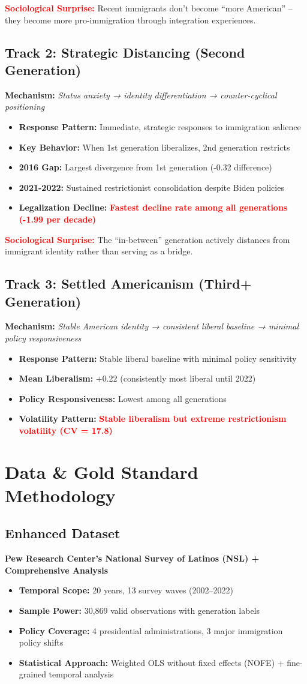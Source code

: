 \documentclass[11pt,letterpaper]{article}
\newcommand{\compactdesc}[2]{\item \textbf{#1:} #2}
\newcommand{\surprise}[1]{\textcolor{red}{\textbf{#1}}}
\begin{document}
\surprise{\textbf{Sociological Surprise:}} Recent immigrants don't become ``more American'' -- they become more pro-immigration through integration experiences.

\subsection{Track 2: Strategic Distancing (Second Generation)}

\textbf{Mechanism:} \textit{Status anxiety → identity differentiation → counter-cyclical positioning}

\begin{itemize}
    \compactdesc{Response Pattern}{Immediate, strategic responses to immigration salience}
    \compactdesc{Key Behavior}{When 1st generation liberalizes, 2nd generation restricts}
    \compactdesc{2016 Gap}{Largest divergence from 1st generation (-0.32 difference)}
    \compactdesc{2021-2022}{Sustained restrictionist consolidation despite Biden policies}
    \compactdesc{Legalization Decline}{\surprise{Fastest decline rate among all generations (-1.99 per decade)}}
\end{itemize}

\surprise{\textbf{Sociological Surprise:}} The ``in-between'' generation actively distances from immigrant identity rather than serving as a bridge.

\subsection{Track 3: Settled Americanism (Third+ Generation)}

\textbf{Mechanism:} \textit{Stable American identity → consistent liberal baseline → minimal policy responsiveness}

\begin{itemize}
    \compactdesc{Response Pattern}{Stable liberal baseline with minimal policy sensitivity}
    \compactdesc{Mean Liberalism}{+0.22 (consistently most liberal until 2022)}
    \compactdesc{Policy Responsiveness}{Lowest among all generations}
    \compactdesc{Volatility Pattern}{\surprise{Stable liberalism but extreme restrictionism volatility (CV = 17.8)}}
\end{itemize}

\section{Data \& Gold Standard Methodology}

\subsection{Enhanced Dataset}
\textbf{Pew Research Center's National Survey of Latinos (NSL) + Comprehensive Analysis}
\begin{itemize}
    \compactdesc{Temporal Scope}{20 years, 13 survey waves (2002--2022)}
    \compactdesc{Sample Power}{30,869 valid observations with generation labels}
    \compactdesc{Policy Coverage}{4 presidential administrations, 3 major immigration policy shifts}
    \compactdesc{Statistical Approach}{Weighted OLS without fixed effects (NOFE) + fine-grained temporal analysis}
\end{itemize}
\end{document}

